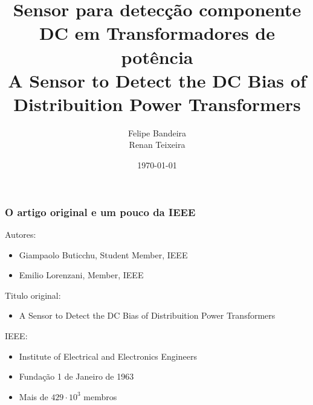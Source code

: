 \documentclass{beamer}
\title[Sensor para detecção componente DC]{Sensor para detecção componente DC em Transformadores de potência\\\small{A Sensor to Detect the DC Bias of Distribuition Power Transformers}} %
\author{Felipe Bandeira\\Renan Teixeira} %
\institute[Unifor] %
{
Universidade de Fortaleza-UNIFOR\\%
\medskip
}
\date{\today} %
\begin{document}
\begin{frame}
\titlepage %
\end{frame}



\begin{frame}
    \frametitle{O artigo original e um pouco da IEEE}

    Autores:
    \begin{itemize}
        \item Giampaolo Buticchu, Student Member, IEEE
        \item Emilio Lorenzani, Member, IEEE
    \end{itemize}
    Titulo original:
    \begin{itemize}
        \item A Sensor to Detect the DC Bias of Distribuition Power Transformers
    \end{itemize}

    IEEE:
    \begin{itemize}
        \item Institute of Electrical and Electronics Engineers
        \item Fundação 1 de Janeiro de 1963
        \item Mais de $429 \cdot 10^3 $ membros
    \end{itemize}
\end{frame}
\end{document}
